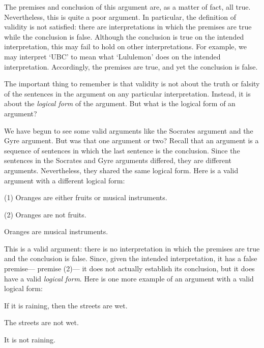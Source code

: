 The premises and conclusion of this argument are, as a matter of fact, all true.
Nevertheless, this is quite a poor argument.
In particular, the definition of validity is not satisfied: there are interpretations in which the premises are true while the conclusion is false.
Although the conclusion is true on the intended interpretation, this may fail to hold on other interpretations.
For example, we may interpret `UBC' to mean what `Lululemon' does on the intended interpretation.
Accordingly, the premises are true, and yet the conclusion is false.

The important thing to remember is that validity is not about the truth or falsity of the sentences in the argument on any particular interpretation. 
Instead, it is about the \textit{logical form} of the argument.
But what is the logical form of an argument?

We have begun to see some valid arguments like the Socrates argument and the Gyre argument.
But was that one argument or two?
Recall that an argument is a sequence of sentences in which the last sentence is the conclusion.
Since the sentences in the Socrates and Gyre arguments differed, they are different arguments.
Nevertheless, they shared the same logical form.
Here is a valid argument with a different logical form:

\begin{earg}
  \item[(1)] Oranges are either fruits or musical instruments.
  \item[(2)] Oranges are not fruits.
  \item[\therefore] Oranges are musical instruments.
\end{earg}

This is a valid argument: there is no interpretation in which the premises are true and the conclusion is false.
Since, given the intended interpretation, it has a false premise--- premise (2)--- it does not actually establish its conclusion, but it does have a valid \emph{logical form}.
Here is one more example of an argument with a valid logical form:

\begin{earg}
  \item If it is raining, then the streets are wet.
  \item The streets are not wet.
  \item[\therefore] It is not raining.
\end{earg}

